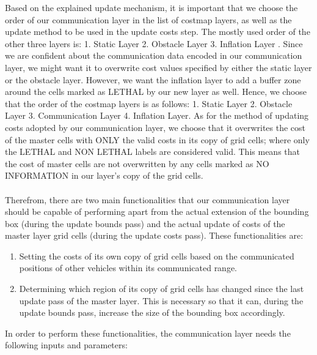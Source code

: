 \begin{enumerate}
    Based on the explained update mechanism, it is important that we choose the order of our communication layer in the list of costmap layers, as well as the update method to be used in the update costs step. The mostly used order of the other three layers is: 1. Static Layer 2. Obstacle Layer 3. Inflation Layer \cite{costmap}. Since we are confident about the communication data encoded in our communication layer, we might want it to overwrite cost values specified by either the static layer or the obstacle layer. However, we want the inflation layer to add a buffer zone around the cells marked as LETHAL by our new layer as well. Hence, we choose that the order of the costmap layers is as follows: 1. Static Layer 2. Obstacle Layer 3. Communication Layer 4. Inflation Layer. As for the method of updating costs adopted by our communication layer, we choose that it overwrites the cost of the master cells with ONLY the valid costs in its copy of grid cells; where only the LETHAL and NON LETHAL labels are considered valid. This means that the cost of master cells are not overwritten by any cells marked as NO INFORMATION in our layer’s copy of the grid cells.
    \\ \\
    Therefrom, there are two main functionalities that our communication layer should be capable of performing apart from the actual extension of the bounding box (during the update bounds pass) and the actual update of costs of the master layer grid cells (during the update costs pass). These functionalities are:
    
    \begin{enumerate}
        \item Setting the costs of its own copy of grid cells based on the communicated positions of other vehicles within its communicated range.
        \item Determining which region of its copy of grid cells has changed since the last update pass of the master layer. This is necessary so that it can, during the update bounds pass, increase the size of the bounding box accordingly.
    \end{enumerate}
    
    In order to perform these functionalities, the communication layer needs the following inputs and parameters:


\end{enumerate}
